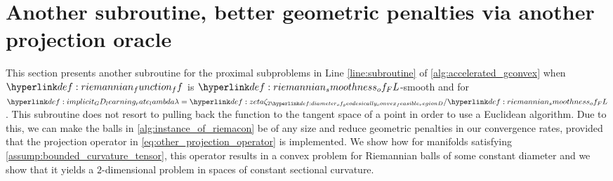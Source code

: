 \documentclass[12pt]{alt2021}
\begin{document}
\section{Another subroutine, better geometric penalties via another projection oracle}\label{sec:other_subroutine}

This section presents another subroutine for the proximal subproblems in Line \ref{line:subroutine} of \cref{alg:accelerated_gconvex} when $\f$ is $\L$-smooth and for $\lambda = \zeta{2\D}/\L$. This subroutine does not resort to pulling back the function to the tangent space of a point in order to use a Euclidean algorithm. Due to this, we can make the balls in \cref{alg:instance_of_riemacon} be of any size and reduce geometric penalties in our convergence rates, provided that the projection operator in \eqref{eq:other_projection_operator} is implemented. We show how for manifolds satisfying \cref{assump:bounded_curvature_tensor}, this operator results in a convex problem for Riemannian balls of some constant diameter and we show that it yields a $2$-dimensional problem in spaces of constant sectional curvature. 
\end{document}
